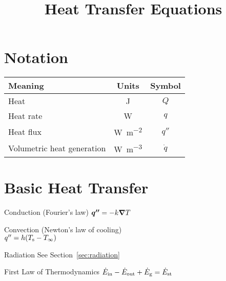 \documentclass{article}
\title{Heat Transfer Equations}
\begin{document}


\begin{multicols}{2}
\setlength{\columnseprule}{0.5pt}

\section{Notation}
\begin{tabu}{lcc}
  \toprule
  Meaning & Units & Symbol \\
  \midrule
  Heat & \si{\joule} & $Q$ \\
  Heat rate & \si{\watt} & $q$ \\
  Heat flux & \si{\watt\per\square\meter} & $q''$ \\
  Volumetric heat generation & \si{\watt\per\cubic\meter} & $\dot q$ \\
  \bottomrule
\end{tabu}

\section{Basic Heat Transfer}

\begin{description*}
\item[Conduction (Fourier's law)]
  \(\bm{q''} = -k \bm{\nabla} T\)
\item[Convection (Newton's law of cooling)]~\\
  \(q'' = h(T_{\mathrm{s}}-T_\infty)\)
\item[Radiation] See Section~\ref{sec:radiation}
\item[First Law of Thermodynamics]
  \(\dot{E}_{\mathrm{in}}-\dot{E}_{\mathrm{out}}+\dot{E}_{\mathrm{g}} = \dot{E}_{\mathrm{st}}\)
\end{description*}


\end{multicols}
\end{document}
